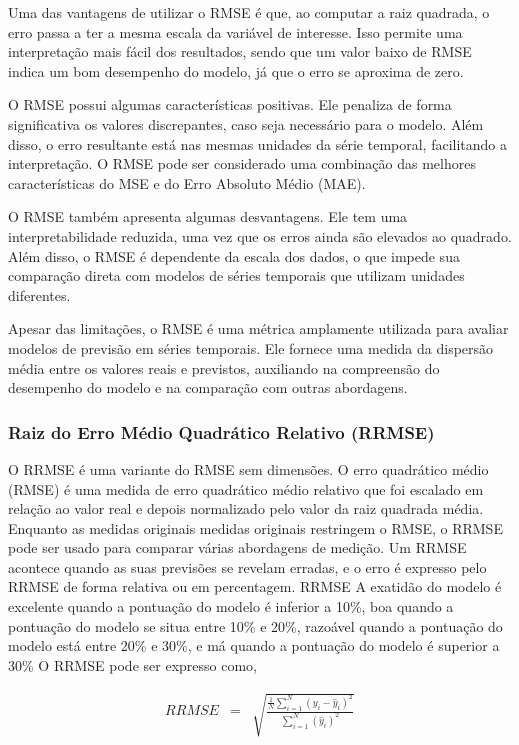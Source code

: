 Uma das vantagens de utilizar o RMSE é que, ao computar a raiz quadrada, o erro passa a ter a mesma escala da variável de interesse. Isso permite uma interpretação mais fácil dos resultados, sendo que um valor baixo de RMSE indica um bom desempenho do modelo, já que o erro se aproxima de zero.

O RMSE possui algumas características positivas. Ele penaliza de forma significativa os valores discrepantes, caso seja necessário para o modelo. Além disso, o erro resultante está nas mesmas unidades da série temporal, facilitando a interpretação. O RMSE pode ser considerado uma combinação das melhores características do MSE e do Erro Absoluto Médio (MAE).

O RMSE também apresenta algumas desvantagens. Ele tem uma interpretabilidade reduzida, uma vez que os erros ainda são elevados ao quadrado. Além disso, o RMSE é dependente da escala dos dados, o que impede sua comparação direta com modelos de séries temporais que utilizam unidades diferentes.

Apesar das limitações, o RMSE é uma métrica amplamente utilizada para avaliar modelos de previsão em séries temporais. Ele fornece uma medida da dispersão média entre os valores reais e previstos, auxiliando na compreensão do desempenho do modelo e na comparação com outras abordagens.

\subsubsection{Raiz do Erro M\'edio Quadr\'atico Relativo (RRMSE)}\label{subsub:rrmse}

O RRMSE é uma variante do RMSE sem dimensões. O erro quadrático médio (RMSE) é uma medida de erro quadrático médio relativo que foi escalado em relação ao valor real e depois normalizado pelo valor da raiz quadrada média. Enquanto as medidas originais medidas originais restringem o RMSE, o RRMSE pode ser usado para  comparar várias abordagens de medição. Um RRMSE acontece quando as suas previsões se revelam erradas, e o erro é expresso pelo RRMSE de forma relativa ou em percentagem. RRMSE A exatidão do modelo é excelente quando a pontuação do modelo é inferior a 10\%, boa quando a pontuação do modelo se situa entre 10\% e 20\%, razoável quando a pontuação do modelo está entre 20\% e 30\%, e má quando a pontuação do modelo é superior a 30\% O RRMSE pode ser expresso como,

\begin{eqnarray}
	R R M S E&=&\sqrt{\frac{\frac{1}{N} \sum_{i=1}^N\left(y_i-\hat{y}_i\right)^2}{\sum_{i=1}^N\left(\hat{y}_i\right)^2}}
\end{eqnarray}

